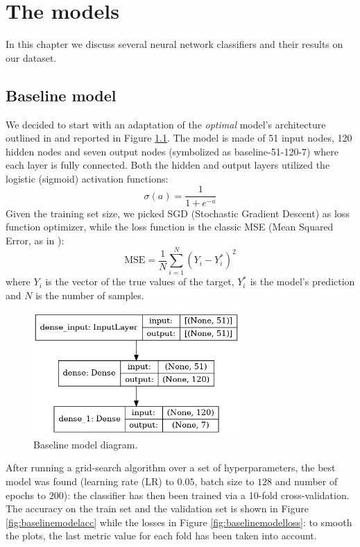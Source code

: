 \chapter{The models}
In this chapter we discuss several neural network classifiers and their results on our dataset.
\section{Baseline model}
\label{sec:baselinemodel}
We decided to start with an adaptation of the \textit{optimal} model's architecture outlined in \cite{blackardDean} and reported in Figure \ref{fig:baselinemodel}. The model is made of 51 input nodes, 120 hidden nodes and seven output nodes (symbolized as baseline-51-120-7) where each layer is fully connected. Both the hidden and output layers utilized the logistic (sigmoid) activation functions:
$$
\sigma(a) = \frac{1}{1 + e^{-a}}
$$
Given the training set size, we picked SGD (Stochastic Gradient Descent) as loss function optimizer, while the loss function is the classic MSE (Mean Squared Error, as in \cite{blackardDean}):
\begin{equation}
\text{MSE} = \frac{1}{N}\sum_{i=1}^{N}(Y_i - Y^{*}_{i})^2
\end{equation}
where $Y_i$ is the vector of the true values of the target, $Y^{*}_{i}$ is the model's prediction and $N$ is the number of samples.
\begin{figure}
\centering
\includegraphics[width=0.7\textwidth]{./TeX_files/img/baselinemodel.png}
\caption{Baseline model diagram.}
\label{fig:baselinemodel}
\end{figure}
After running a grid-search algorithm over a set of hyperparameters, the best model was found (learning rate (LR) to $0.05$, batch size to $128$ and number of epochs to $200$): the classifier has then been trained via a 10-fold cross-validation. The accuracy on the train set and the validation set is shown in Figure \ref{fig:baselinemodelacc} while the losses in Figure \ref{fig:baselinemodelloss}: to smooth the plots, the last metric value for each fold has been taken into account.
